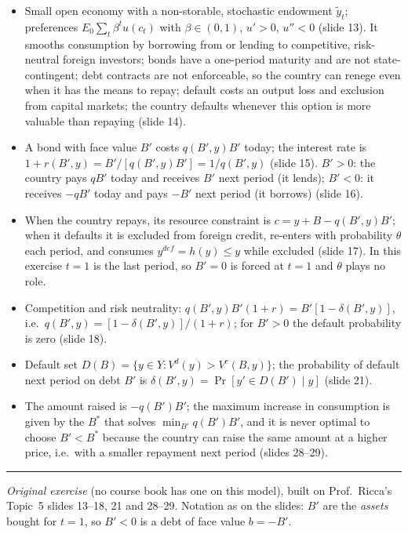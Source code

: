 \documentclass[11pt,a4paper]{article}
\providecommand{\tightlist}{\setlength{\itemsep}{0pt}\setlength{\parskip}{0pt}}
\newcommand{\stmtend}{\par\endgroup\nopagebreak\noindent\rule{\linewidth}{0.4pt}\par\medskip}
\begin{document}
\begin{itemize}
\tightlist
\item
  Small open economy with a non-storable, stochastic endowment \(\tilde y_t\); preferences
  \(E_0\sum_t \beta^t u(c_t)\) with \(\beta \in (0,1)\), \(u' > 0\), \(u'' < 0\) (slide 13). It
  smooths consumption by borrowing from or lending to competitive, risk-neutral foreign investors;
  bonds have a one-period maturity and are not state-contingent; debt contracts are not enforceable,
  so the country can renege even when it has the means to repay; default costs an output loss and
  exclusion from capital markets; the country defaults whenever this option is more valuable than
  repaying (slide 14).
\item
  A bond with face value \(B'\) costs \(q(B', y)B'\) today; the interest rate is
  \(1 + r(B', y) = B'/[q(B', y)B'] = 1/q(B', y)\) (slide 15). \(B' > 0\): the country pays \(qB'\)
  today and receives \(B'\) next period (it lends); \(B' < 0\): it receives \(-qB'\) today and pays
  \(-B'\) next period (it borrows) (slide 16).
\item
  When the country repays, its resource constraint is \(c = y + B - q(B', y)B'\); when it defaults
  it is excluded from foreign credit, re-enters with probability \(\theta\) each period, and
  consumes \(y^{def} = h(y) \le y\) while excluded (slide 17). In this exercise \(t = 1\) is the
  last period, so \(B' = 0\) is forced at \(t = 1\) and \(\theta\) plays no role.
\item
  Competition and risk neutrality: \(q(B', y)B'(1 + r) = B'[1 - \delta(B', y)]\),
  i.e.~\(q(B', y) = [1 - \delta(B', y)]/(1 + r)\); for \(B' > 0\) the default probability is zero
  (slide 18).
\item
  Default set \(D(B) = \{y \in Y : V^d(y) > V^c(B, y)\}\); the probability of default next period on
  debt \(B'\) is \(\delta(B', y) = \Pr[y' \in D(B') \mid y]\) (slide 21).
\item
  The amount raised is \(-q(B')B'\); the maximum increase in consumption is given by the \(B^*\)
  that solves \(\min_{B'} q(B')B'\), and it is never optimal to choose \(B' < B^*\) because the
  country can raise the same amount at a higher price, i.e.~with a smaller repayment next period
  (slides 28--29).
\end{itemize}
\stmtend

\noindent\emph{Original exercise} (no course book has one on this model), built on Prof.\ Ricca's Topic~5 slides 13--18, 21 and 28--29.
Notation as on the slides: $B'$ are the \emph{assets} bought for $t=1$, so $B'<0$ is a debt of face value $b=-B'$.
\end{document}

